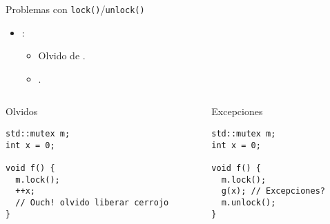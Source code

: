 \begin{frame}[t,fragile]{Problemas con \texttt{lock()}/\texttt{unlock()}}
\begin{itemize}
  \item {}:
    \begin{itemize}
      \item Olvido de .
      \item {}.
    \end{itemize}
\end{itemize}

\begin{columns}[T]
\begin{column}{.5\textwidth}
\begin{block}{Olvidos}
\begin{lstlisting}
std::mutex m;
int x = 0;

void f() {
  m.lock();
  ++x;
  // Ouch! olvido liberar cerrojo
}
\end{lstlisting}
\end{block}
\end{column}

\begin{column}{.5\textwidth}
\begin{block}{Excepciones}
\begin{lstlisting}
std::mutex m;
int x = 0;

void f() {
  m.lock();
  g(x); // Excepciones?
  m.unlock();
}
\end{lstlisting}
\end{block}
\end{column}
\end{columns}
\end{frame}


